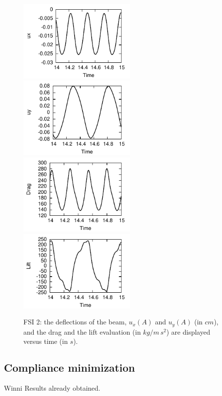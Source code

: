 \documentclass[prodmode,acmtoms]{acmsmall}
\numberwithin{equation}{section}
\begin{document}
\begin{figure}
\centering
{\includegraphics[width=5.8cm]{Pictures/ux_FSI_2_FS_t_3e-2_t_15e-3_global_2_Hron_grid.pdf}}
{\includegraphics[width=5.8cm]{Pictures/uy_FSI_2_FS_t_3e-2_t_15e-3_global_2_Hron_grid.pdf}}
{\includegraphics[width=5.8cm]{Pictures/Drag_fluid_FSI_2_FS_t_3e-2_t_15e-3_global_2_Hron_grid.pdf}}
{\includegraphics[width=5.8cm]{Pictures/Lift_fluid_FSI_2_FS_t_3e-2_t_15e-3_global_2_Hron_grid.pdf}}
\caption{FSI 2: the deflections of the beam, $u_x(A)$ and $u_y(A)$ (in $cm$), and 
the drag and the lift evaluation (in $kg/m\,s^2$) are displayed versus
time (in $s$).
} 
\label{res:results_ux_and_uy_fsi_2}
\end{figure}


\subsection{Compliance minimization}
Winni
Results already obtained.
\end{document}
